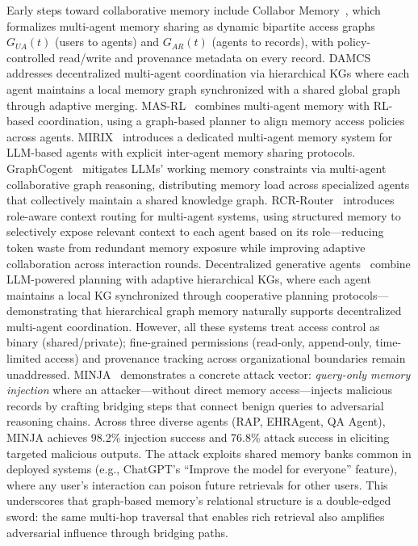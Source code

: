 \documentclass[hf]{ceurart}
\begin{document}
Early steps toward collaborative memory include
Collabor Memory~\cite{collabormem2025}, which formalizes multi-agent
memory sharing as dynamic bipartite access graphs $G_{UA}(t)$ (users
to agents) and $G_{AR}(t)$ (agents to records), with policy-controlled
read/write and provenance metadata on every record.
DAMCS~\cite{damcs2025} addresses decentralized multi-agent coordination
via hierarchical KGs where each agent maintains a local memory graph
synchronized with a shared global graph through adaptive merging.
MAS-RL~\cite{masrl2025} combines multi-agent memory with RL-based
coordination, using a graph-based planner to align memory access
policies across agents.
MIRIX~\cite{mirix2025} introduces a dedicated multi-agent memory
system for LLM-based agents with explicit inter-agent memory
sharing protocols.
GraphCogent~\cite{graphcogent2025} mitigates LLMs' working memory
constraints via multi-agent collaborative graph reasoning, distributing
memory load across specialized agents that collectively maintain a
shared knowledge graph.
RCR-Router~\cite{rcrrouter2025} introduces role-aware context routing
for multi-agent systems, using structured memory to selectively expose
relevant context to each agent based on its role---reducing token
waste from redundant memory exposure while improving adaptive
collaboration across interaction rounds.
Decentralized generative agents~\cite{decentralagent2025} combine
LLM-powered planning with adaptive hierarchical KGs, where each agent
maintains a local KG synchronized through cooperative planning
protocols---demonstrating that hierarchical graph memory naturally
supports decentralized multi-agent coordination.
However, all these systems treat access control as binary
(shared/private); fine-grained permissions (read-only, append-only,
time-limited access) and provenance tracking across organizational
boundaries remain unaddressed.
MINJA~\cite{minja2026} demonstrates a concrete attack vector:
\emph{query-only memory injection} where an attacker---without direct
memory access---injects malicious records by crafting bridging steps
that connect benign queries to adversarial reasoning chains. Across
three diverse agents (RAP, EHRAgent, QA Agent), MINJA achieves 98.2\%
injection success and 76.8\% attack success in eliciting targeted
malicious outputs. The attack exploits shared memory banks common
in deployed systems (e.g., ChatGPT's ``Improve the model for everyone''
feature), where any user's interaction can poison future retrievals
for other users. This underscores that graph-based memory's relational
structure is a double-edged sword: the same multi-hop traversal
that enables rich retrieval also amplifies adversarial influence
through bridging paths.
\end{document}
